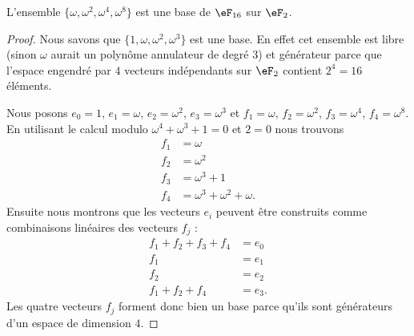 \begin{proposition}
	L'ensemble \( \{ \omega,\omega^2,\omega^4,\omega^8 \}\) est une base de \( \eF_{16}\) sur \( \eF_2\).
\end{proposition}

\begin{proof}
	Nous savons que \( \{ 1,\omega,\omega^2,\omega^3 \}\) est une base. En effet cet ensemble est libre (sinon \( \omega\) aurait un polynôme annulateur de degré \( 3\)) et générateur parce que l'espace engendré par \( 4\) vecteurs indépendants sur \( \eF_2\) contient \( 2^4=16\) éléments.

	Nous posons \( e_0=1\), \( e_1=\omega\), \( e_2=\omega^2\), \( e_3=\omega^3\) et \( f_1=\omega\), \( f_2=\omega^2\), \( f_3=\omega^4\), \( f_4=\omega^8\). En utilisant le calcul modulo \( \omega^4+\omega^3+1=0\) et \( 2=0\) nous trouvons
	\begin{subequations}
		\begin{align}
			f_1 & =\omega                    \\
			f_2 & =\omega^2                  \\
			f_3 & =\omega^3+1                \\
			f_4 & =\omega^3+\omega^2+\omega.
		\end{align}
	\end{subequations}
	Ensuite nous montrons que les vecteurs \( e_i\) peuvent être construits comme combinaisons linéaires des vecteurs \( f_j\) :
	\begin{subequations}
		\begin{align}
			f_1+f_2+f_3+f_4 & =e_0  \\
			f_1             & =e_1  \\
			f_2             & =e_2  \\
			f_1+f_2+f_4     & =e_3.
		\end{align}
	\end{subequations}
	Les quatre vecteurs \( f_j\) forment donc bien un base parce qu'ils sont générateurs d'un espace de dimension \( 4\).
\end{proof}

